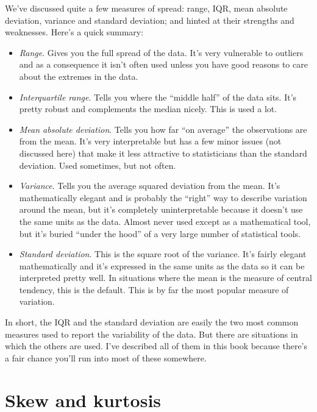 
We've discussed quite a few measures of spread: range, IQR, mean absolute deviation, variance and standard deviation; and hinted at their strengths and weaknesses. Here's a quick summary:

\begin{itemize}
\item {\it Range}. Gives you the full spread of the data. It's very vulnerable to outliers and as a consequence it isn't often used unless you have good reasons to care about the extremes in the data.
\item {\it Interquartile range}. Tells you where the ``middle half'' of the data sits. It's pretty robust and complements the median nicely. This is used a lot.
\item {\it Mean absolute deviation}. Tells you how far ``on average'' the observations are from the mean. It's very interpretable but has a few minor issues (not discussed here) that make it less attractive to statisticians than the standard deviation. Used sometimes, but not often.
\item {\it Variance}. Tells you the average squared deviation from the mean. It's mathematically elegant and is probably the ``right'' way to describe variation around the mean, but it's completely uninterpretable because it doesn't use the same units as the data. Almost never used except as a mathematical tool, but it's buried ``under the hood'' of a very large number of statistical tools.
\item {\it Standard deviation}. This is the square root of the variance. It's fairly elegant mathematically and it's expressed in the same units as the data so it can be interpreted pretty well. In situations where the mean is the measure of central tendency, this is the default. This is by far the most popular measure of variation. 
\end{itemize}

\noindent
In short, the IQR and the standard deviation are easily the two most common measures used to report the variability of the data. But there are situations in which the others are used. I've described all of them in this book because there's a fair chance you'll run into most of these somewhere.

\section{Skew and kurtosis \label{sec:skewkurt}}

